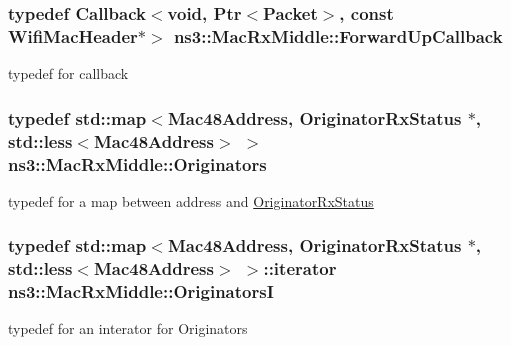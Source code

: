 \subsubsection[{\texorpdfstring{Forward\+Up\+Callback}{ForwardUpCallback}}]{\setlength{\rightskip}{0pt plus 5cm}typedef {\bf Callback}$<$void, {\bf Ptr}$<${\bf Packet}$>$, const {\bf Wifi\+Mac\+Header}$\ast$$>$ {\bf ns3\+::\+Mac\+Rx\+Middle\+::\+Forward\+Up\+Callback}}\hypertarget{classns3_1_1MacRxMiddle_ad1a3ee168f7826b71385af2cec382c81}{}\label{classns3_1_1MacRxMiddle_ad1a3ee168f7826b71385af2cec382c81}
typedef for callback 
\subsubsection[{\texorpdfstring{Originators}{Originators}}]{\setlength{\rightskip}{0pt plus 5cm}typedef std\+::map$<${\bf Mac48\+Address}, {\bf Originator\+Rx\+Status} $\ast$, std\+::less$<${\bf Mac48\+Address}$>$ $>$ {\bf ns3\+::\+Mac\+Rx\+Middle\+::\+Originators}\hspace{0.3cm}{\ttfamily [private]}}\hypertarget{classns3_1_1MacRxMiddle_a6263189b2a22e164f77f0a9d58d035cc}{}\label{classns3_1_1MacRxMiddle_a6263189b2a22e164f77f0a9d58d035cc}
typedef for a map between address and \hyperlink{classns3_1_1OriginatorRxStatus}{Originator\+Rx\+Status} 
\subsubsection[{\texorpdfstring{OriginatorsI}{OriginatorsI}}]{\setlength{\rightskip}{0pt plus 5cm}typedef std\+::map$<${\bf Mac48\+Address}, {\bf Originator\+Rx\+Status} $\ast$, std\+::less$<${\bf Mac48\+Address}$>$ $>$\+::iterator {\bf ns3\+::\+Mac\+Rx\+Middle\+::\+OriginatorsI}\hspace{0.3cm}{\ttfamily [private]}}\hypertarget{classns3_1_1MacRxMiddle_a51c8afc428c943f9992af8eeabd981d7}{}\label{classns3_1_1MacRxMiddle_a51c8afc428c943f9992af8eeabd981d7}
typedef for an interator for Originators 
